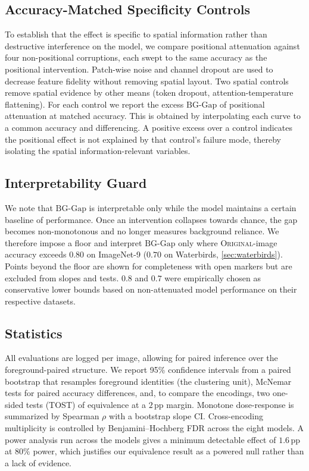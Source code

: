\documentclass[10pt,twocolumn,letterpaper]{article}
\begin{document}
\subsection{Accuracy-Matched Specificity Controls}
\label{sec:specificity}
To establish that the effect is specific to spatial information rather than destructive interference on the model, we compare positional attenuation against four non-positional corruptions, each swept to the same accuracy as the positional intervention. Patch-wise noise and channel dropout are used to decrease feature fidelity without removing spatial layout. Two spatial controls remove spatial evidence by other means (token dropout, attention-temperature flattening). For each control we report the excess $\mathrm{BG\text{-}Gap}$ of positional attenuation at matched accuracy. This is obtained by interpolating each curve to a common accuracy and differencing. A positive excess over a control indicates the positional effect is not explained by that control's failure mode, thereby isolating the spatial information-relevant variables.

\subsection{Interpretability Guard}
\label{sec:guard}
We note that $\mathrm{BG\text{-}Gap}$ is interpretable only while the model maintains a certain baseline of performance. Once an intervention collapses towards chance, the gap becomes non-monotonous and no longer measures background reliance. We therefore impose a floor and interpret $\mathrm{BG\text{-}Gap}$ only where \textsc{Original}-image accuracy exceeds $0.80$ on ImageNet-9 ($0.70$ on Waterbirds, \cref{sec:waterbirds}). Points beyond the floor are shown for completeness with open markers but are excluded from slopes and tests. $0.8$ and $0.7$ were empirically chosen as conservative lower bounds based on non-attenuated model performance on their respective datasets.

\subsection{Statistics}
\label{sec:stats}
All evaluations are logged per image, allowing for paired inference over the foreground-paired structure. We report 95\% confidence intervals from a paired bootstrap that resamples foreground identities (the clustering unit), McNemar tests for paired accuracy differences, and, to compare the encodings, two one-sided tests (TOST) of equivalence at a $2$\,pp margin. Monotone dose-response is summarized by Spearman $\rho$ with a bootstrap slope CI. Cross-encoding multiplicity is controlled by Benjamini--Hochberg FDR across the eight models. A power analysis run across the models gives a minimum detectable effect of $1.6$\,pp at $80\%$ power, which justifies our equivalence result as a powered null rather than a lack of evidence.
\end{document}
